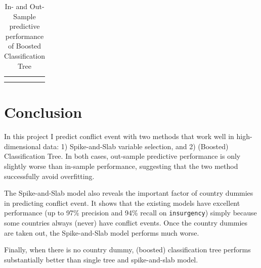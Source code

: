 \documentclass{article}
\begin{document}
\begin{table}[!ht]
\centering
\begin{tabular}{c}
\subfloat[In-Sample]{\label{tab:boosting_insample}
	}\\
\subfloat[Out-Sample]{\label{tab:boosting_outsample}
	}
\end{tabular}
\caption{In- and Out-Sample predictive performance of Boosted Classification Tree}
\end{table}

\section{Conclusion}

In this project I predict conflict event with two methods that work well in high-dimensional data: 1) Spike-and-Slab variable selection, and 2) (Boosted) Classification Tree. In both cases, out-sample predictive performance is only slightly worse than in-sample performance, suggesting that the two method successfully avoid overfitting.

The Spike-and-Slab model also reveals the important factor of country dummies in predicting conflict event. It shows that the existing models have excellent performance (up to 97\% precision and 94\% recall on \verb|insurgency|) simply because some countries always (never) have conflict events. Once the country dummies are taken out, the Spike-and-Slab model performs much worse.

Finally, when there is no country dummy, (boosted) classification tree performs substantially better than single tree and spike-and-slab model.
\end{document}

